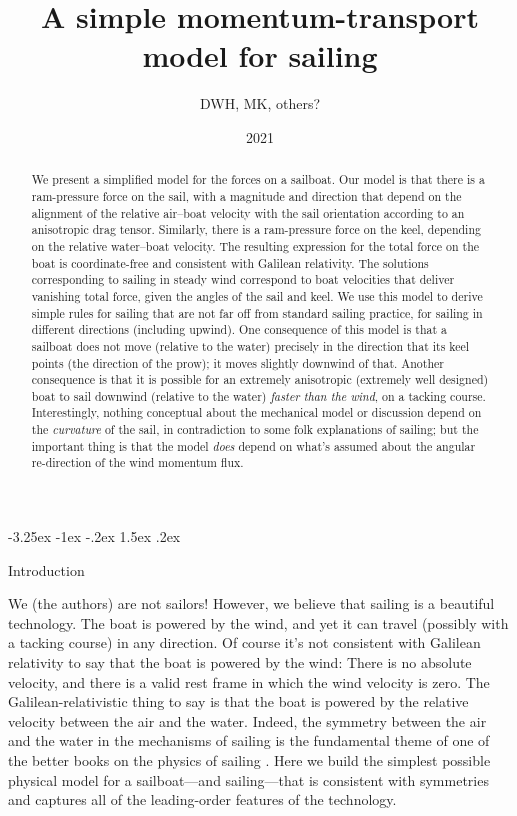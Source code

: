 \documentclass[letterpaper]{article}
\title{\bfseries%
A simple momentum-transport model for sailing}
\author{DWH, MK, others?}
\date{2021}
\makeatletter
\renewcommand\section{\@startsection {section}{1}{\z@}%
  {-3.25ex \@plus -1ex \@minus -.2ex}%
  {1.5ex \@plus .2ex}%
  {\raggedright\normalfont\large\bfseries}}
\makeatother
\begin{document}
\maketitle

\begin{abstract}\noindent
    We present a simplified model for the forces on a sailboat.
    Our model is that there is a ram-pressure force on the sail, with a magnitude and direction that depend on the alignment of the relative air--boat velocity with the sail orientation according to an anisotropic drag tensor.
    Similarly, there is a ram-pressure force on the keel, depending on the relative water--boat velocity.
    The resulting expression for the total force on the boat is coordinate-free and consistent with Galilean relativity.
    The solutions corresponding to sailing in steady wind correspond to boat velocities that deliver vanishing total force, given the angles of the sail and keel.
    We use this model to derive simple rules for sailing that are not far off from standard sailing practice, for sailing in different directions (including upwind).
    One consequence of this model is that a sailboat does not move (relative to the water) precisely in the direction that its keel points (the direction of the prow); it moves slightly downwind of that.
    Another consequence is that it is possible for an extremely anisotropic (extremely well designed) boat to sail downwind (relative to the water) \emph{faster than the wind}, on a tacking course.
    Interestingly, nothing conceptual about the mechanical model or discussion depend on the \emph{curvature} of the sail, in contradiction to some folk explanations of sailing; but the important thing is that the model \emph{does} depend on what's assumed about the angular re-direction of the wind momentum flux.
\end{abstract}

\section{Introduction}\label{sec:intro}

We (the authors) are not sailors!
However, we believe that sailing is a beautiful technology.
The boat is powered by the wind, and yet it can travel (possibly with a tacking course) in any direction.
Of course it's not consistent with Galilean relativity to say that the boat is powered by the wind:
There is no absolute velocity, and there is a valid rest frame in which the wind velocity is zero.
The Galilean-relativistic thing to say is that the boat is powered by the relative velocity between the air and the water.
Indeed, the symmetry between the air and the water in the mechanisms of sailing is the fundamental theme of one of the better books on the physics of sailing \cite{symmetry}.
Here we build the simplest possible physical model for a sailboat---and sailing---that is consistent with symmetries and captures all of the leading-order features of the technology.
\end{document}
